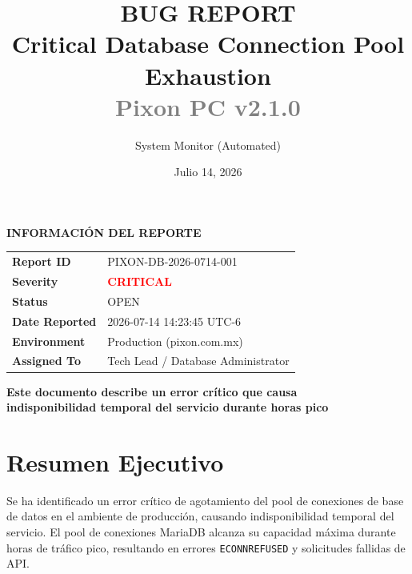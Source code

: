 \documentclass[12pt,a4paper]{article}
\title{%
  \Huge\textbf{\textcolor{azuldark}{BUG REPORT}} \\
  \LARGE\textcolor{azuldark}{Critical Database Connection Pool Exhaustion} \\
  \large\textcolor{gray}{Pixon PC v2.1.0}
}
\author{System Monitor (Automated)}
\date{Julio 14, 2026}
\begin{document}
\maketitle
\thispagestyle{fancy}

\begin{center}
\vspace{2cm}
\textbf{\Large INFORMACIÓN DEL REPORTE}
\end{center}

\begin{table}[h]
\centering
\begin{tabular}{|l|p{10cm}|}
\toprule
\textbf{Report ID} & PIXON-DB-2026-0714-001 \\
\textbf{Severity} & \textcolor{red}{\textbf{CRITICAL}} \\
\textbf{Status} & OPEN \\
\textbf{Date Reported} & 2026-07-14 14:23:45 UTC-6 \\
\textbf{Environment} & Production (pixon.com.mx) \\
\textbf{Assigned To} & Tech Lead / Database Administrator \\
\bottomrule
\end{tabular}
\end{table}

\vspace{1cm}

\begin{center}
\textbf{Este documento describe un error crítico que causa} \\
\textbf{indisponibilidad temporal del servicio durante horas pico}
\end{center}

\newpage

\tableofcontents
\newpage

\section{Resumen Ejecutivo}

Se ha identificado un error crítico de agotamiento del pool de conexiones de base de datos en el ambiente de producción, causando indisponibilidad temporal del servicio. El pool de conexiones MariaDB alcanza su capacidad máxima durante horas de tráfico pico, resultando en errores \texttt{ECONNREFUSED} y solicitudes fallidas de API.
\end{document}
